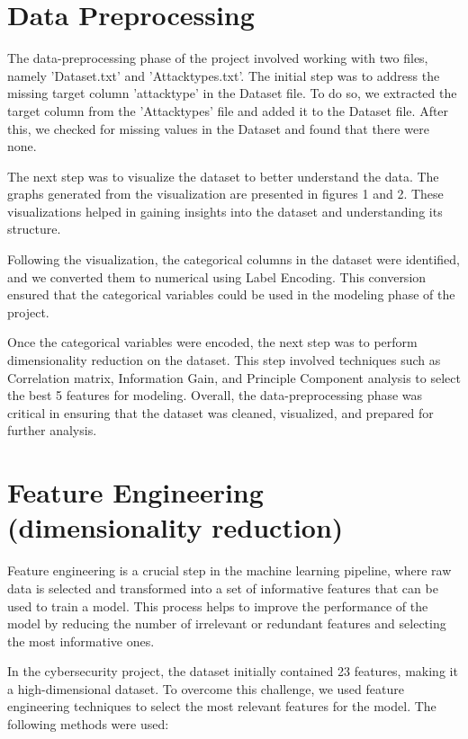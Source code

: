 \documentclass{article}
\begin{document}
\section{Data Preprocessing}
The data-preprocessing phase of the project involved working with two files, namely 'Dataset.txt' and 'Attacktypes.txt'. The initial step was to address the missing target column 'attacktype' in the Dataset file. To do so, we extracted the target column from the 'Attacktypes' file and added it to the Dataset file. After this, we checked for missing values in the Dataset and found that there were none.

The next step was to visualize the dataset to better understand the data. The graphs generated from the visualization are presented in figures 1 and 2. These visualizations helped in gaining insights into the dataset and understanding its structure.

Following the visualization, the categorical columns in the dataset were identified, and we converted them to numerical using Label Encoding. This conversion ensured that the categorical variables could be used in the modeling phase of the project.

Once the categorical variables were encoded, the next step was to perform dimensionality reduction on the dataset. This step involved techniques such as Correlation matrix, Information Gain, and Principle Component analysis to select the best 5 features for modeling. Overall, the data-preprocessing phase was critical in ensuring that the dataset was cleaned, visualized, and prepared for further analysis.




\section{Feature Engineering (dimensionality reduction)}

Feature engineering is a crucial step in the machine learning pipeline, where raw data is selected and transformed into a set of informative features that can be used to train a model. This process helps to improve the performance of the model by reducing the number of irrelevant or redundant features and selecting the most informative ones.

In the cybersecurity project, the dataset initially contained 23 features, making it a high-dimensional dataset. To overcome this challenge, we used feature engineering techniques to select the most relevant features for the model. The following methods were used:
\end{document}

